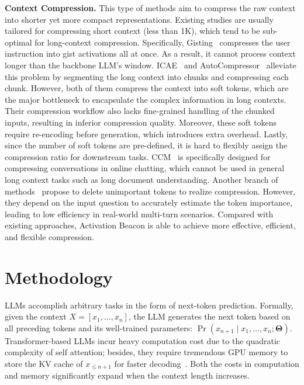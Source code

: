 \textbf{Context Compression.} This type of methods aim to compress the raw context into shorter yet more compact representations. Existing studies are usually tailored for compressing short context (less than 1K), which tend to be sub-optimal for long-context compression. Specifically, Gisting~\citep{wu2023gist} compresses the user instruction into gist activations all at once. As a result, it cannot process context longer than the backbone LLM's window. ICAE~\citep{ge2024icae} and AutoCompressor~\citep{chevalier2023autocompressors} alleviate this problem by segmenting the long context into chunks and compressing each chunk. However, both of them compress the context into soft tokens, which are the major bottleneck to encapsulate the complex information in long contexts. Their compression workflow also lacks fine-grained handling of the chunked inputs, resulting in inferior compression quality. Moreover, these soft tokens require re-encoding before generation, which introduces extra overhead. Lastly, since the number of soft tokens are pre-defined, it is hard to flexibly assign the compression ratio for downstream tasks. CCM~\citep{kim2024ccm} is specifically designed for compressing conversations in online chatting, which cannot be used in general long context tasks such as long document understanding. Another branch of methods~\citep{jiang2023longllmlingua,li2024snapkv} propose to delete unimportant tokens to realize compression. However, they depend on the input question to accurately estimate the token importance, leading to low efficiency in real-world multi-turn scenarios. Compared with existing approaches, Activation Beacon is able to achieve more effective, efficient, and flexible compression.

\section{Methodology}

LLMs accomplish arbitrary tasks in the form of next-token prediction. Formally, given the context $X=[x_1, \dots, x_{n}]$, the LLM generates the next token based on all preceding tokens and its well-trained parameters: $\Pr(x_{n+1}\mid x_1, \dots , x_{n}; \boldsymbol{\Theta})$. 
Transformer-based LLMs incur heavy computation cost due to the quadratic complexity of self attention; besides, they require tremendous GPU memory to store the KV cache of $x_{\le n+1}$ for faster decoding~\citep{zhang2023h2o}. Both the costs in computation and memory significantly expand when the context length increases.

